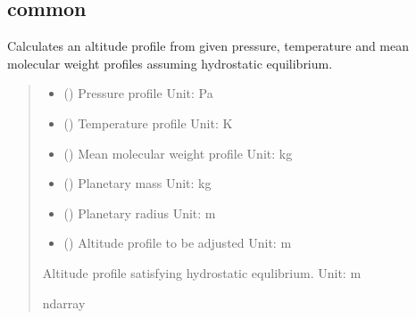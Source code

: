 \documentclass[letterpaper,10pt,english]{sphinxmanual}
\begin{document}
\subsection{common}
\label{\detokenize{api:common}}

\begin{fulllineitems}
\label{\detokenize{api:nemesispy.calc_hydrostat}}
\pysigstartsignatures
{}
\pysigstopsignatures
\sphinxAtStartPar
Calculates an altitude profile from given pressure, temperature and
mean molecular weight profiles assuming hydrostatic equilibrium.
\begin{quote}\begin{description}
\begin{itemize}
\item {} 
\sphinxAtStartPar
{} () \textendash{} Pressure profile
Unit: Pa

\item {} 
\sphinxAtStartPar
{} () \textendash{} Temperature profile
Unit: K

\item {} 
\sphinxAtStartPar
{} () \textendash{} Mean molecular weight profile
Unit: kg

\item {} 
\sphinxAtStartPar
{} () \textendash{} Planetary mass
Unit: kg

\item {} 
\sphinxAtStartPar
{} () \textendash{} Planetary radius
Unit: m

\item {} 
\sphinxAtStartPar
{} () \textendash{} Altitude profile to be adjusted
Unit: m

\end{itemize}

\sphinxAtStartPar
{} \textendash{} Altitude profile satisfying hydrostatic equlibrium.
Unit: m

\sphinxAtStartPar
ndarray

\end{description}\end{quote}

\end{fulllineitems}
\end{document}
